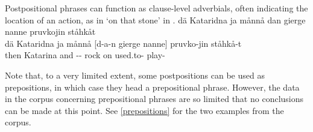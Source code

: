 Postpositional phrases %
can function as clause-level adverbials, often indicating the location of an action, as in  ‘on that stone’ in . 
\ea\label{ADVppEx1}%
\glll	dä Kataridna ja månnå dan gierge nanne pruvkojin ståhkåt\\
	dä Kataridna ja månnå {[d-a-n} gierge {nanne]\subPP} pruvko-jin ståhkå-t\\
	then Katarina\BS{} and  -- rock\BS{} on used.to- play-\\\nopagebreak
{}	
\z


Note that, to a very limited extent, some postpositions can be used as prepositions, in which case they head a prepositional phrase. However, the data in the corpus concerning prepositional phrases are so limited that no conclusions can be made at this point. See \SEC\ref{prepositions} for the two examples from the corpus. 




